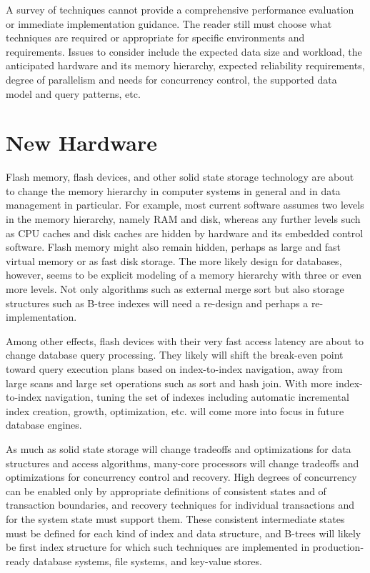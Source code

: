 A survey of techniques cannot provide a comprehensive performance
evaluation or immediate implementation guidance. The reader still must
choose what techniques are required or appropriate for specific
environments and requirements. Issues to consider include the expected
data size and workload, the anticipated hardware and its memory
hierarchy, expected reliability requirements, degree of parallelism and
needs for concurrency control, the supported data model and query
patterns, etc.

\hypertarget{new-hardware}{%
\section{New Hardware}\label{new-hardware}}

Flash memory, flash devices, and other solid state storage technology
are about to change the memory hierarchy in computer systems in general
and in data management in particular. For example, most current software
assumes two levels in the memory hierarchy, namely RAM and disk, whereas
any further levels such as CPU caches and disk caches are hidden by
hardware and its embedded control software. Flash memory might also
remain hidden, perhaps as large and fast virtual memory or as fast disk
storage. The more likely design for databases, however, seems to be
explicit modeling of a memory hierarchy with three or even more levels.
Not only algorithms such as external merge sort but also storage
structures such as B-tree indexes will need a re-design and perhaps a
re-implementation.

Among other effects, flash devices with their very fast access latency
are about to change database query processing. They likely will shift
the break-even point toward query execution plans based on
index-to-index navigation, away from large scans and large set
operations such as sort and hash join. With more index-to-index
navigation, tuning the set of indexes including automatic incremental
index creation, growth, optimization, etc. will come more into focus in
future database engines.

As much as solid state storage will change tradeoffs and optimizations
for data structures and access algorithms, many-core processors will
change tradeoffs and optimizations for concurrency control and recovery.
High degrees of concurrency can be enabled only by appropriate
definitions of consistent states and of transaction boundaries, and
recovery techniques for individual transactions and for the system state
must support them. These consistent intermediate states must be defined
for each kind of index and data structure, and B-trees will likely be
first index structure for which such techniques are implemented in
production-ready database systems, file systems, and key-value stores.

